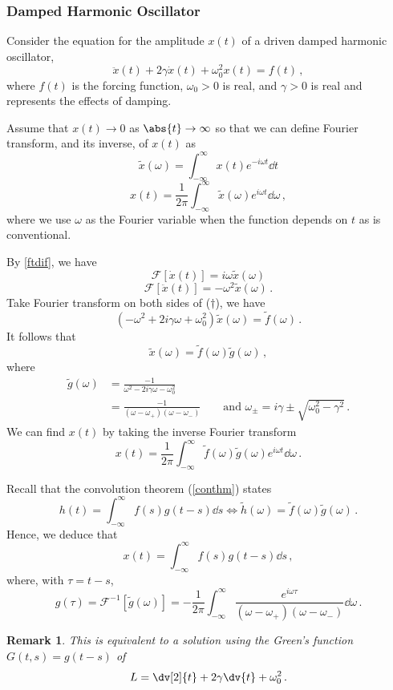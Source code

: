 \documentclass{article}
\theoremstyle{plain}\theoremheaderfont{\normalfont\itshape}\theorembodyfont{\rmfamily}\theoremseparator{.}\newtheorem*{rem}{Remark}\newtheorem*{ex}{Example}\newtheorem*{proof}{Proof}\newtheorem*{altp}{Alternative proof}
\theoremstyle{plain}\theoremheaderfont{\normalfont\bfseries}\theorembodyfont{\rmfamily}\theoremseparator{.}\newtheorem{thm}{Theorem}[section]\newtheorem{lem}[thm]{Lemma}\newtheorem{prop}[thm]{Proposition}\newtheorem*{cor}{Corollary}\newtheorem{defn}[thm]{Definition}\newtheorem{clm}[thm]{Claim}\newtheorem{clminproof}{Claim}
\theoremstyle{break}\theoremheaderfont{\normalfont\itshape}\theorembodyfont{\rmfamily}\theoremseparator{.\medskip}\newtheorem*{proofskip}{Proof}\newtheorem*{exs}{Examples}\newtheorem*{rems}{Remarks}
\theoremstyle{break}\theoremheaderfont{\normalfont\bfseries}\theorembodyfont{\rmfamily}\theoremseparator{.\medskip}\newtheorem{lemskip}[thm]{Lemma}\newtheorem{defnskip}[thm]{Definition}\newtheorem{propskip}[thm]{Proposition}\newtheorem{thmskip}[thm]{Theorem}
\numberwithin{equation}{section}
\begin{document}
	\subsubsection{Damped Harmonic Oscillator}
	Consider the equation for the amplitude \(x(t)\) of a driven damped harmonic oscillator,
	\begin{equation}\tag{\(\dagger\)}
		\ddot{x}(t)+2\gamma\dot{x}(t)+\omega_0^2 x(t)=f(t)\,,
	\end{equation}
	where \(f(t)\) is the forcing function, \(\omega_0>0\) is real, and \(\gamma>0\) is real and represents the effects of damping.

	Assume that \(x(t)\to 0\) as \(\abs{t}\to\infty\) so that we can define Fourier transform, and its inverse, of \(x(t)\) as
	\[\tilde{x}(\omega)=\int_{-\infty}^{\infty}x(t)e^{-i\omega t}\dd{t}\]
	\[x(t)=\frac{1}{2\pi}\int_{-\infty}^{\infty}\tilde{x}(\omega)e^{i\omega t}\dd{\omega}\,,\]
	where we use \(\omega\) as the Fourier variable when the function depends on \(t\) as is conventional.

	By \cref{ftdif}, we have
	\[\mathcal{F}[\dot{x}(t)]=i\omega\tilde{x}(\omega)\]
	\[\mathcal{F}[\ddot{x}(t)]=-\omega^2\tilde{x}(\omega)\,.\]
	Take Fourier transform on both sides of (\(\dagger\)), we have
	\[(-\omega^2+2i\gamma\omega+\omega_0^2)\tilde{x}(\omega)=\tilde{f}(\omega)\,.\]
	It follows that
	\[\tilde{x}(\omega)=\tilde{f}(\omega)\tilde{g}(\omega)\,,\]
	where
	\begin{align*}
		\tilde{g}(\omega)&=\frac{-1}{\omega^2-2i\gamma\omega-\omega_0^2}\\
		&=\frac{-1}{(\omega-\omega_+)(\omega-\omega_-)}\qquad\text{and }\omega_\pm=i\gamma\pm\sqrt{\omega_0^2-\gamma^2}\,.
	\end{align*}
	We can find \(x(t)\) by taking the inverse Fourier transform
	\[x(t)=\frac{1}{2\pi}\int_{-\infty}^{\infty}\tilde{f}(\omega)\tilde{g}(\omega)e^{i\omega t}\dd{\omega}\,.\]

	Recall that the convolution theorem (\cref{conthm}) states
	\[h(t)=\int_{-\infty}^{\infty}f(s)g(t-s)\dd{s}\iff \tilde{h}(\omega)=\tilde{f}(\omega)\tilde{g}(\omega)\,.\]
	Hence, we deduce that
	\[x(t)=\int_{-\infty}^{\infty}f(s)g(t-s)\dd{s}\,,\]
	where, with \(\tau=t-s\),
	\[g(\tau)=\mathcal{F}^{-1}[\tilde{g}(\omega)]=-\frac{1}{2\pi}\int_{-\infty}^{\infty}\frac{e^{i\omega\tau}}{(\omega-\omega_+)(\omega-\omega_-)}\dd{\omega}\,.\]

	\begin{rem}
		This is equivalent to a solution using the Green's function \(G(t,s)=g(t-s)\) of
		\[L=\dv[2]{t}+2\gamma\dv{t}+\omega_0^2\,.\]
	\end{rem}
\end{document}
